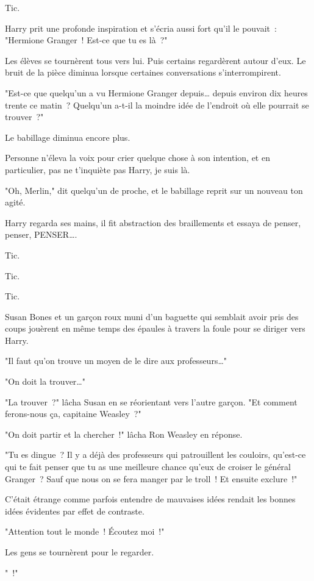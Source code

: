 Tic.

Harry prit une profonde inspiration et s'écria aussi fort qu'il le pouvait~: "Hermione Granger~! Est-ce que tu es là~?"

Les élèves se tournèrent tous vers lui. Puis certains regardèrent autour d'eux. Le bruit de la pièce diminua lorsque certaines conversations s'interrompirent.

"Est-ce que quelqu'un a vu Hermione Granger depuis… depuis environ dix heures trente ce matin~? Quelqu'un a-t-il la moindre idée de l'endroit où elle pourrait se trouver~?"

Le babillage diminua encore plus.

Personne n'éleva la voix pour crier quelque chose à son intention, et en particulier, pas ne t'inquiète pas Harry, je suis là.

"Oh, Merlin," dit quelqu'un de proche, et le babillage reprit sur un nouveau ton agité.

Harry regarda ses mains, il fit abstraction des braillements et essaya de penser, penser, PENSER….

Tic.

Tic.

Tic.

Susan Bones et un garçon roux muni d'un baguette qui semblait avoir pris des coups jouèrent en même temps des épaules à travers la foule pour se diriger vers Harry.

"Il faut qu'on trouve un moyen de le dire aux professeurs…"

"On doit la trouver…"

"La trouver~?" lâcha Susan en se réorientant vers l'autre garçon. "Et comment ferons-nous ça, capitaine Weasley~?"

"On doit partir et la chercher~!" lâcha Ron Weasley en réponse.

"Tu es dingue~? Il y a déjà des professeurs qui patrouillent les couloirs, qu'est-ce qui te fait penser que tu as une meilleure chance qu'eux de croiser le général Granger~? Sauf que nous on se fera manger par le troll~! Et ensuite exclure~!"

C'était étrange comme parfois entendre de mauvaises idées rendait les bonnes idées évidentes par effet de contraste.

"Attention tout le monde~! Écoutez moi~!"

Les gens se tournèrent pour le regarder.

"~!"

